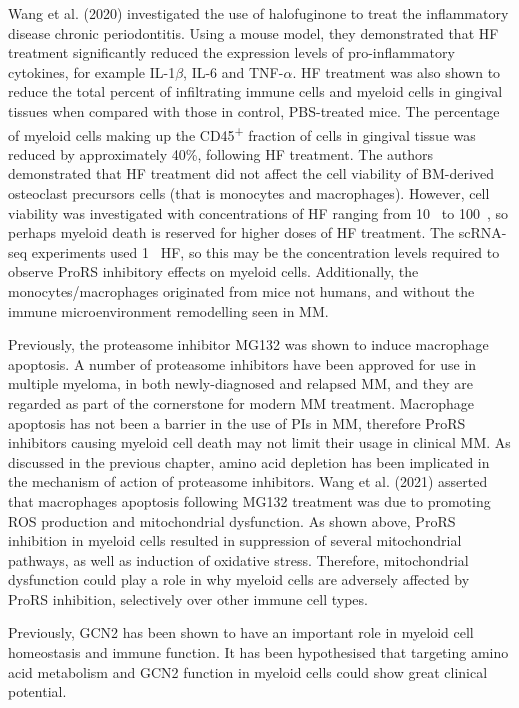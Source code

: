 Wang et al. (2020) investigated the use of halofuginone to treat the inflammatory disease chronic periodontitis\cite{wang2020halofuginone}.
Using a mouse model, they demonstrated that HF treatment significantly reduced the expression levels of pro-inflammatory cytokines, for example IL-1$\beta$, IL-6 and TNF-$\alpha$.
HF treatment was also shown to reduce the total percent of infiltrating immune cells and myeloid cells in gingival tissues when compared with those in control, PBS-treated mice.
The percentage of myeloid cells making up the CD45\textsuperscript{+} fraction of cells in gingival tissue was reduced by approximately 40\%, following HF treatment.
The authors demonstrated that HF treatment did not affect the cell viability of BM-derived osteoclast precursors cells (that is monocytes and macrophages).
However, cell viability was investigated with concentrations of HF ranging from 10\si{\pico\Molar} to 100\si{\nano\Molar}, so perhaps myeloid death is reserved for higher doses of HF treatment.
The scRNA-seq experiments used 1\si{\micro\Molar} HF, so this may be the concentration levels required to observe ProRS inhibitory effects on myeloid cells.
Additionally, the monocytes/macrophages originated from mice not humans, and without the immune microenvironment remodelling seen in MM\@.

Previously, the proteasome inhibitor MG132 was shown to induce macrophage apoptosis\cite{wang2021proteasome}.
A number of proteasome inhibitors have been approved for use in multiple myeloma, in both newly-diagnosed and relapsed MM, and they are regarded as part of the cornerstone for modern MM treatment.
Macrophage apoptosis has not been a barrier in the use of PIs in MM, therefore ProRS inhibitors causing myeloid cell death may not limit their usage in clinical MM\@.
As discussed in the previous chapter, amino acid depletion has been implicated in the mechanism of action of proteasome inhibitors.
Wang et al. (2021) asserted that macrophages apoptosis following MG132 treatment was due to promoting ROS production and mitochondrial dysfunction\cite{wang2021proteasome}.
As shown above, ProRS inhibition in myeloid cells resulted in suppression of several mitochondrial pathways, as well as induction of oxidative stress.
Therefore, mitochondrial dysfunction could play a role in why myeloid cells are adversely affected by ProRS inhibition, selectively over other immune cell types.


Previously, GCN2 has been shown to have an important role in myeloid cell homeostasis and immune function.
It has been hypothesised that targeting amino acid metabolism and GCN2 function in myeloid cells could show great clinical potential\cite{liu2014role}.

